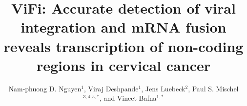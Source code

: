 \documentclass[a4,center,fleqn]{NAR}
\begin{document}
\title{ViFi: Accurate detection of viral integration and mRNA fusion reveals transcription of non-coding regions in cervical cancer}

\author
{Nam-phuong D. Nguyen$^{1}$, Viraj Deshpande$^{1}$, 
Jens Luebeck$^{2}$, Paul S. Mischel$^{3,4,5,*}$, and Vineet Bafna$^{1,*}$\\
}

\address{%
\normalsize{$^{1}$Computer Science and Engineering, University of California,}\\
\normalsize{San Diego, 9500 Gilman Dr, La Jolla, CA, 92093, USA.,}\\
\normalsize{$^{2}$Bioinformatics and Systems Biology Program, University of California,}\\
\normalsize{San Diego, 9500 Gilman Dr, La Jolla, CA, 92093, USA.,}\\
\normalsize{$^{3}$Ludwig Institute for Cancer Research, University of California,}\\
\normalsize{San Diego, 9500 Gilman Dr, La Jolla, CA, 92093, USA.,}\\
\normalsize{$^{4}$Department of Pathology, University of California,}\\
\normalsize{San Diego, 9500 Gilman Dr, La Jolla, CA, 92093, USA.,}\\
\normalsize{$^{5}$Moores Cancer Center, University of California,}\\
\normalsize{San Diego, 9500 Gilman Dr, La Jolla, CA, 92093, USA.}\\
}


\maketitle
\end{document}
